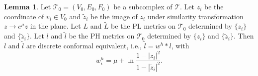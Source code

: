 \documentclass[12pt]{amsart}
\theoremstyle{definition}
\newtheorem{lemma}[theorem]{Lemma}
\def\qed{\hfill{Q.E.D.}\smallskip}
\begin{document}
\begin{lemma}\label{Lem: DCE}
Let $\mathcal{T}_0=(V_0,E_0,F_0)$ be a subcomplex of $\mathcal{T}$. Let $z_i$ be the coordinate of $v_i\in V_0$ and $\tilde z_i$ be the image of $z_i$ under similarity transformation $z\rightarrow e^\mu z$ in the plane. Let $L$ and $\tilde L$ be the PL metrics on $\mathcal{T}_0$ determined by $\{z_i\}$ and $\{\tilde z_i\}$. Let $l$ and $\tilde l$ be the PH metrics on $\mathcal{T}_0$ determined by $\{z_i\}$ and $\{\tilde z_i\}$. 
Then $l$ and $\tilde{l}$ are discrete conformal equivalent, i.e., $\tilde{l}=w^h*l$, with
\begin{equation}\label{Eq: F53}
w^h_i=\mu+\ln \frac{1-|z_i|^2}{1-|\tilde{z}_i|^2}.
\end{equation}
\end{lemma}
\end{document}
